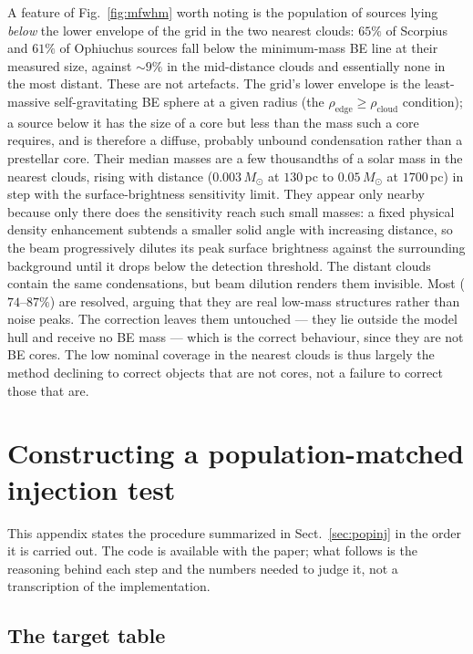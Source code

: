\documentclass[11pt,a4paper]{article}
\newcommand{\msun}{M_{\odot}}
\begin{document}
A feature of Fig.~\ref{fig:mfwhm} worth noting is the population of sources
lying \emph{below} the lower envelope of the grid in the two nearest clouds:
$65\%$ of Scorpius and $61\%$ of Ophiuchus sources fall below the minimum-mass
BE line at their measured size, against $\sim$$9\%$ in the mid-distance clouds
and essentially none in the most distant. These are not artefacts. The grid's
lower envelope is the least-massive self-gravitating BE sphere at a given
radius (the $\rho_{\mathrm{edge}}\ge\rho_{\mathrm{cloud}}$ condition); a source
below it has the size of a core but less than the mass such a core requires,
and is therefore a diffuse, probably unbound condensation rather than a
prestellar core. Their median masses are a few thousandths of a solar mass in
the nearest clouds, rising with distance ($0.003\,\msun$ at $130$\,pc to
$0.05\,\msun$ at $1700$\,pc) in step with the surface-brightness sensitivity
limit. They appear only nearby because only there does the sensitivity reach
such small masses: a fixed physical density enhancement subtends a smaller
solid angle with increasing distance, so the beam progressively dilutes its
peak surface brightness against the surrounding background until it drops below
the detection threshold. The distant clouds contain the same condensations,
but beam dilution renders them invisible. Most ($74$--$87\%$) are resolved,
arguing that they are real low-mass structures rather than noise peaks. The correction leaves them
untouched --- they lie outside the model hull and receive no BE mass --- which
is the correct behaviour, since they are not BE cores. The low nominal coverage
in the nearest clouds is thus largely the method declining to correct objects
that are not cores, not a failure to correct those that are.

\section{Constructing a population-matched injection test}
\label{app:injection}

This appendix states the procedure summarized in Sect.~\ref{sec:popinj} in the
order it is carried out. The code is available with the paper; what follows is
the reasoning behind each step and the numbers needed to judge it, not a
transcription of the implementation.

\subsection{The target table}
\end{document}
